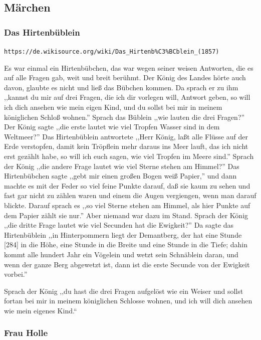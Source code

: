 \documentclass[10pt,a4paper]{article}
\begin{document}
\subsection{Märchen}

\subsubsection{Das Hirtenbüblein}

\verb+https://de.wikisource.org/wiki/Das_Hirtenb%C3%BCblein_(1857)+

\vskip 4pt
Es war einmal ein Hirtenbübchen, das war wegen seiner weisen Antworten, die es
auf alle Fragen gab, weit und breit berühmt. Der König des Landes hörte auch
davon, glaubte es nicht und ließ das Bübchen kommen. Da sprach er zu ihm
,,kannst du mir auf drei Fragen, die ich dir vorlegen will, Antwort geben, so
will ich dich ansehen wie mein eigen Kind, und du sollst bei mir in meinem
königlichen Schloß wohnen.'' Sprach das Büblein ,,wie lauten die drei Fragen?''
Der König sagte ,,die erste lautet wie viel Tropfen Wasser sind in dem
Weltmeer?'' Das Hirtenbüblein antwortete ,,Herr König, laßt alle Flüsse auf der
Erde verstopfen, damit kein Tröpflein mehr daraus ins Meer lauft, das ich nicht
erst gezählt habe, so will ich euch sagen, wie viel Tropfen im Meere sind.''
Sprach der König ,,die andere Frage lautet wie viel Sterne stehen am Himmel?''
Das Hirtenbübchen sagte ,,gebt mir einen großen Bogen weiß Papier,'' und dann
machte es mit der Feder so viel feine Punkte darauf, daß sie kaum zu sehen und
fast gar nicht zu zählen waren und einem die Augen vergiengen, wenn man darauf
blickte. Darauf sprach es ,,so viel Sterne stehen am Himmel, als hier Punkte auf
dem Papier zählt sie nur.'' Aber niemand war dazu im Stand. Sprach der König
,,die dritte Frage lautet wie viel Secunden hat die Ewigkeit?'' Da sagte das
Hirtenbüblein ,,in Hinterpommern liegt der Demantberg, der hat eine Stunde [284]
in die Höhe, eine Stunde in die Breite und eine Stunde in die Tiefe; dahin kommt
alle hundert Jahr ein Vögelein und wetzt sein Schnäblein daran, und wenn der
ganze Berg abgewetzt ist, dann ist die erste Secunde von der Ewigkeit vorbei.''

\vskip 4pt
Sprach der König ,,du hast die drei Fragen aufgelöst wie ein Weiser und sollst
fortan bei mir in meinem königlichen Schlosse wohnen, und ich will dich ansehen
wie mein eigenes Kind.“

\subsubsection{Frau Holle}
\end{document}
